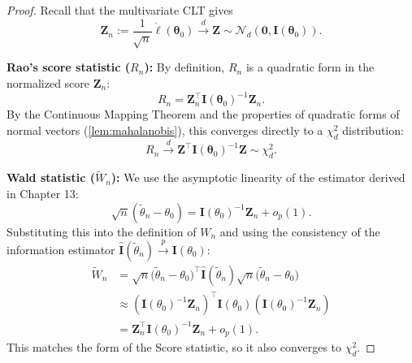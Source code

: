 \begin{proof}
Recall that the multivariate CLT gives
\[ \mathbf{Z}_n := \frac{1}{\sqrt{n}} \dot{\ell}(\boldsymbol{\theta}_0) \stackrel{d}{\longrightarrow} \mathbf{Z} \sim \mathcal{N}_d(\mathbf{0}, \mathbf{I}(\boldsymbol{\theta}_0)). \]

\textbf{Rao's score statistic ($R_n$):}
By definition, $R_n$ is a quadratic form in the normalized score $\mathbf{Z}_n$:
\[ R_n = \mathbf{Z}_n^{\top} \mathbf{I}(\boldsymbol{\theta}_0)^{-1} \mathbf{Z}_n. \]
By the Continuous Mapping Theorem and the properties of quadratic forms of normal vectors (\autoref{lem:mahalanobis}), this converges directly to a $\chi^2_d$ distribution:
\[ R_n \xrightarrow{d} \mathbf{Z}^{\top} \mathbf{I}(\boldsymbol{\theta}_0)^{-1} \mathbf{Z} \sim \chi_d^2. \]

\textbf{Wald statistic ($\widetilde{W}_n$):}
We use the asymptotic linearity of the estimator derived in Chapter 13:
\[ \sqrt{n}(\tilde{\theta}_n - \theta_0) = \mathbf{I}(\theta_0)^{-1}\mathbf{Z}_n + o_p(1). \]
Substituting this into the definition of $W_n$ and using the consistency of the information estimator $\hat{\mathbf{I}}(\tilde{\theta}_n) \stackrel{p}{\longrightarrow} \mathbf{I}(\theta_0)$:
\[ \begin{split} \widetilde{W}_n &= \sqrt{n} \big(\widetilde{\theta}_n - \theta_0\big)^\top \widehat{\mathbf{I}}(\widetilde{\theta}_n) \sqrt{n} \big(\widetilde{\theta}_n - \theta_0\big) \\ 
&\approx (\mathbf{I}(\theta_0)^{-1}\mathbf{Z}_n)^\top \mathbf{I}(\theta_0) (\mathbf{I}(\theta_0)^{-1}\mathbf{Z}_n) \\
&= \mathbf{Z}_n^\top \mathbf{I}(\theta_0)^{-1} \mathbf{Z}_n + o_p(1). \end{split} \]
This matches the form of the Score statistic, so it also converges to $\chi^2_d$.


\end{proof}
